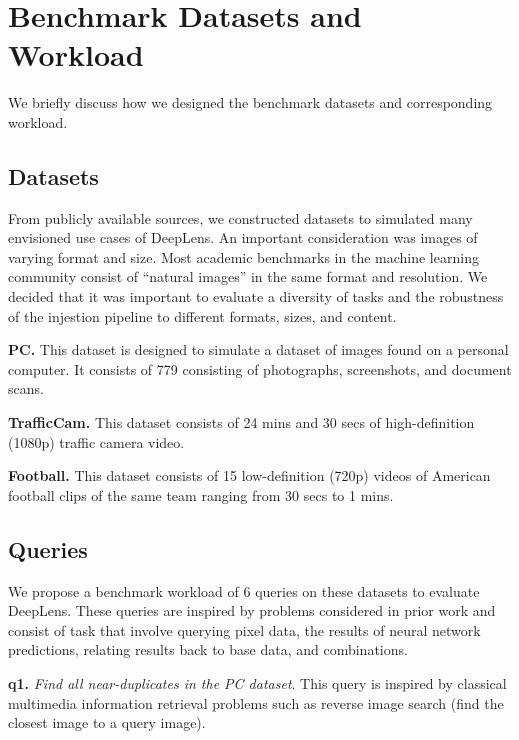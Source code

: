 \section{Benchmark Datasets and \\  Workload}
We briefly discuss how we designed the benchmark datasets and corresponding workload.

\subsection{Datasets}
From publicly available sources, we constructed datasets to simulated many envisioned use cases of \textsf{DeepLens}. An important consideration was images of varying format and size. Most academic benchmarks in the machine learning community consist of ``natural images'' in the same format and resolution. We decided that it was important to evaluate a diversity of tasks and the robustness of the injestion pipeline to different formats, sizes, and content. 

\vspace{0.25em} \noindent \textbf{PC.} This dataset is designed to simulate a dataset of images found on a personal computer. It consists of 779 consisting of photographs, screenshots, and document scans. 

\vspace{0.25em} \noindent \textbf{TrafficCam.} This dataset consists of 24 mins and 30 secs of high-definition (1080p) traffic camera video. 

\vspace{0.25em} \noindent \textbf{Football.} This dataset consists of 15 low-definition (720p) videos of American football clips of the same team ranging from 30 secs to 1 mins. 

\subsection{Queries}
We propose a benchmark workload of 6 queries on these datasets to evaluate \textsf{DeepLens}. These queries are inspired by problems considered in prior work and consist of task that involve querying pixel data, the results of neural network predictions, relating results back to base data, and combinations.

\vspace{0.25em} \noindent \textbf{q1.} \emph{Find all near-duplicates in the PC dataset}. This query is inspired by classical multimedia information retrieval problems such as reverse image search (find the closest image to a query image). 

